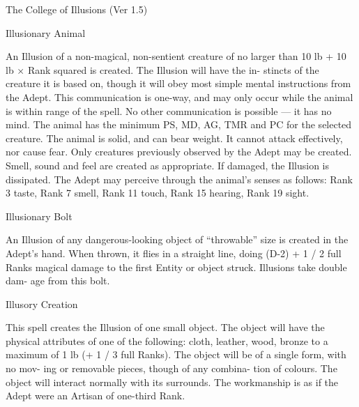 \begin{Chapter}{The College of Illusions (Ver 1.5)}
\begin{spell}[S-1]{Illusionary Animal }
\begin{effects}
An Illusion of a non-magical, non-sentient 
creature  of  no  larger  than  10  lb  +  10  lb  ×  Rank 
squared  is  created.  The  Illusion  will  have  the  in-
stincts of the creature it is based on, though it will 
obey  most  simple  mental  instructions  from  the 
Adept.  This  communication  is  one-way,  and  may 
only occur while the animal is within range of the 
spell. No other communication is possible — it has 
no  mind.  The  animal  has  the  minimum  PS,  MD, 
AG,  TMR  and  PC  for  the  selected  creature.  The 
animal  is  solid,  and  can  bear  weight.  It  cannot 
attack  effectively,  nor  cause  fear.  Only  creatures 
previously  observed  by  the  Adept  may  be  created. 
Smell, sound and feel are created as appropriate. If 
damaged, the Illusion is dissipated. The Adept may 
perceive  through  the  animal’s  senses  as  follows: 
Rank  3  taste,  Rank  7  smell,  Rank  11  touch,  Rank 
15 hearing, Rank 19 sight. 

\end{effects}
\end{spell}

\begin{spell}[S-2]{Illusionary Bolt }

\begin{effects}
 An  Illusion  of  any  dangerous-looking 
object of “throwable” size is created in the Adept’s 
hand. When thrown, it flies in a straight line, doing 
(D-2) + 1 / 2 full Ranks magical damage to the first 
Entity  or  object  struck.  Illusions  take  double  dam-
age from this bolt. 

\end{effects}
\end{spell}

\begin{spell}[S-3]{Illusory Creation }

\begin{effects}
This spell creates the Illusion of one small 
object. The object will have the physical attributes 
of  one  of  the  following:  cloth,  leather,  wood, 
bronze  to a maximum of 1 lb (+ 1 / 3 full Ranks). 
The  object  will  be  of  a  single  form,  with  no  mov-
ing  or  removable  pieces,  though  of  any  combina-
tion  of  colours.  The  object  will  interact  normally 
with  its  surrounds.  The  workmanship  is  as  if  the 
Adept were an Artisan of one-third Rank. 


\end{effects}
\end{spell}
\end{Chapter}
